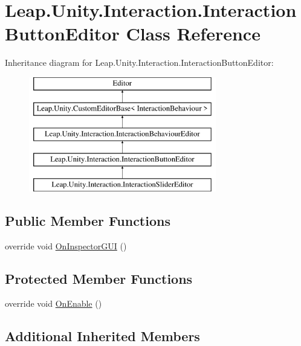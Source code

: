 \hypertarget{class_leap_1_1_unity_1_1_interaction_1_1_interaction_button_editor}{}\section{Leap.\+Unity.\+Interaction.\+Interaction\+Button\+Editor Class Reference}
\label{class_leap_1_1_unity_1_1_interaction_1_1_interaction_button_editor}
Inheritance diagram for Leap.\+Unity.\+Interaction.\+Interaction\+Button\+Editor\+:\begin{figure}[H]
\begin{center}
\leavevmode
\includegraphics[height=5.000000cm]{class_leap_1_1_unity_1_1_interaction_1_1_interaction_button_editor}
\end{center}
\end{figure}
\subsection*{Public Member Functions}
\begin{DoxyCompactItemize}
\item 
override void \mbox{\hyperlink{class_leap_1_1_unity_1_1_interaction_1_1_interaction_button_editor_aef59612f9c7f92072dd7b5bc996ddcf6}{On\+Inspector\+G\+UI}} ()
\end{DoxyCompactItemize}
\subsection*{Protected Member Functions}
\begin{DoxyCompactItemize}
\item 
override void \mbox{\hyperlink{class_leap_1_1_unity_1_1_interaction_1_1_interaction_button_editor_acabb30b7d288e4c778168cb3e9d712d7}{On\+Enable}} ()
\end{DoxyCompactItemize}
\subsection*{Additional Inherited Members}


